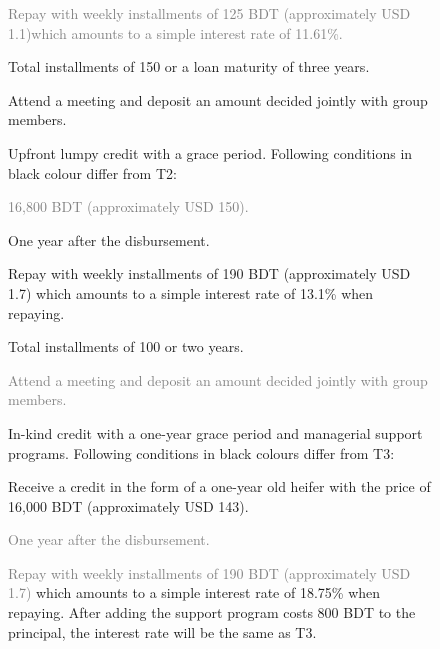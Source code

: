 \begin{figure}
{{\begin{description}
\begin{description}
{		\textcolor{gray}{\item[Installments]	Repay with weekly installments of 125 BDT (approximately USD 1.1)which amounts to a simple interest rate of 11.61\%.}
		\item[Maturity]	Total installments of 150 or a loan maturity of three years.
		\item[Weekly obligations]	Attend a meeting and deposit an amount decided jointly with group members.}
		\end{description}
	\item[T3]	Upfront lumpy credit with a grace period. Following conditions in black colour differ from \textsf{T2}:
		\begin{description}
		\vspace{1ex}\setlength{\itemsep}{.5ex}\setlength{\baselineskip}{8pt}
		\item[\textcolor{gray}{Credit}]	\textcolor{gray}{16,800 BDT (approximately USD 150).}
		\item[Repayment start]	One year after the disbursement.
		\item[Installments]	Repay with weekly installments of 190 BDT (approximately USD 1.7) which amounts to a simple interest rate of 13.1\% when repaying.
		\item[Maturity]	Total installments of 100 or two years. 
		\item[\textcolor{gray}{Weekly obligations}]	\textcolor{gray}{Attend a meeting and deposit an amount decided jointly with group members.}
		\end{description}
	\item[T4]	In-kind credit with a one-year grace period and managerial support programs. Following conditions in black colours differ from \textsf{T3}:
		\begin{description}
		\vspace{1ex}\setlength{\itemsep}{.5ex}\setlength{\baselineskip}{8pt}
		\item[Credit]	Receive a credit in the form of a one-year old heifer with the price of 16,000 BDT (approximately USD 143).
		\item[\textcolor{gray}{Repayment start}]	\textcolor{gray}{One year after the disbursement.}
		\item[\textcolor{gray}{Installments}]	\textcolor{gray}{Repay with weekly installments of 190 BDT (approximately USD 1.7)} which amounts to a simple interest rate of 18.75\% when repaying. After adding the support program costs 800 BDT to the principal, the interest rate will be the same as \textsf{T3}.

\end{description}
\end{description}}}
\end{figure}
